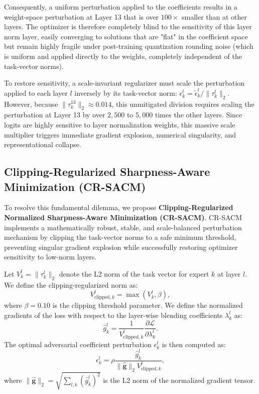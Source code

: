 Consequently, a uniform perturbation applied to the coefficients results in a weight-space perturbation at Layer 13 that is over $100\times$ smaller than at other layers. The optimizer is therefore completely blind to the sensitivity of this layer norm layer, easily converging to solutions that are "flat" in the coefficient space but remain highly fragile under post-training quantization rounding noise (which is uniform and applied directly to the weights, completely independent of the task-vector norms).

To restore sensitivity, a scale-invariant regularizer must scale the perturbation applied to each layer $l$ inversely by its task-vector norm: $\epsilon_k^l = \tilde{\epsilon}_k^l / \|\tau_k^l\|_2$. However, because $\|\tau_k^{13}\|_2 \approx 0.014$, this unmitigated division requires scaling the perturbation at Layer 13 by over $2,500$ to $5,000$ times the other layers. Since logits are highly sensitive to layer normalization weights, this massive scale multiplier triggers immediate gradient explosion, numerical singularity, and representational collapse.

\subsection{Clipping-Regularized Sharpness-Aware Minimization (CR-SACM)}
To resolve this fundamental dilemma, we propose \textbf{Clipping-Regularized Normalized Sharpness-Aware Minimization (CR-SACM)}. CR-SACM implements a mathematically robust, stable, and scale-balanced perturbation mechanism by clipping the task-vector norms to a safe minimum threshold, preventing singular gradient explosion while successfully restoring optimizer sensitivity to low-norm layers.

Let $V_k^l = \|\tau_k^l\|_2$ denote the L2 norm of the task vector for expert $k$ at layer $l$. We define the clipping-regularized norm as:
\begin{equation}
    V_{\text{clipped}, k}^l = \max\left( V_k^l, \beta \right),
\end{equation}
where $\beta = 0.10$ is the clipping threshold parameter. We define the normalized gradients of the loss with respect to the layer-wise blending coefficients $\lambda_k^l$ as:
\begin{equation}
    \hat{g}_k^l = \frac{1}{V_{\text{clipped}, k}^l} \frac{\partial \mathcal{L}}{\partial \lambda_k^l}.
\end{equation}
The optimal adversarial coefficient perturbation $\epsilon_k^l$ is then computed as:
\begin{equation}
\label{eq:cr_sacm_pert}
    \epsilon_k^l = \rho \frac{\hat{g}_k^l}{\|\hat{\mathbf{g}}\|_2 V_{\text{clipped}, k}^l},
\end{equation}
where $\|\hat{\mathbf{g}}\|_2 = \sqrt{\sum_{l,k} (\hat{g}_k^l)^2}$ is the L2 norm of the normalized gradient tensor.

